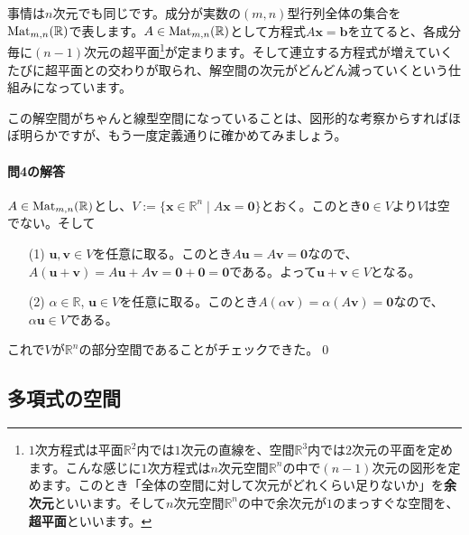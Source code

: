 事情は$n$次元でも同じです。成分が実数の$(m,n)$型行列全体の集合を$\operatorname{Mat}_{m, n}(\mathbb{R})$で表します。$A\in\operatorname{Mat}_{m, n}(\mathbb{R})$として方程式$A\bm{x} = \bm{b}$を立てると、各成分毎に$(n-1)$次元の超平面\footnote{$1$次方程式は平面$\mathbb{R}^2$内では$1$次元の直線を、空間$\mathbb{R}^3$内では$2$次元の平面を定めます。こんな感じに$1$次方程式は$n$次元空間$\mathbb{R}^n$の中で$(n-1)$次元の図形を定めます。このとき「全体の空間に対して次元がどれくらい足りないか」を\textbf{余次元}といいます。そして$n$次元空間$\mathbb{R}^n$の中で余次元が$1$のまっすぐな空間を、\textbf{超平面}といいます。}が定まります。そして連立する方程式が増えていくたびに超平面との交わりが取られ、解空間の次元がどんどん減っていくという仕組みになっています。

この解空間がちゃんと線型空間になっていることは、図形的な考察からすればほぼ明らかですが、もう一度定義通りに確かめてみましょう。

\paragraph{問4の解答}

$A \in \operatorname{Mat}_{m,n}(\mathbb{R})$とし、$V:=\{\bm{x}\in\mathbb{R}^n \mid A\bm{x} = \bm{0} \}$とおく。このとき$\bm{0}\in V$より$V$は空でない。そして
\begin{itemize}
\item[(1)] $\bm{u}, \bm{v}\in V$を任意に取る。このとき$A\bm{u} = A\bm{v} = \bm{0}$なので、$A(\bm{u} + \bm{v}) = A\bm{u} + A\bm{v} = \bm{0} + \bm{0} = \bm{0}$である。よって$\bm{u} + \bm{v} \in V$となる。
\item[(2)] $\alpha\in\mathbb{R}$, $\bm{u}\in V$を任意に取る。このとき$A (\alpha\bm{v}) = \alpha (A\bm{v}) = \bm{0}$なので、$\alpha\bm{u}\in V$である。
\end{itemize}

これで$V$が$\mathbb{R}^n$の部分空間であることがチェックできた。\qed

\subsection{多項式の空間}

